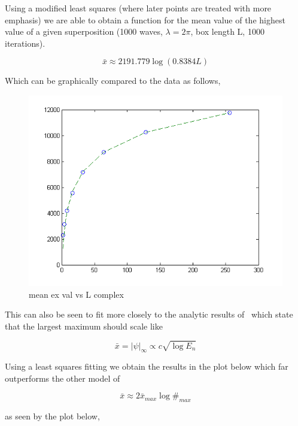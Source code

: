 \documentclass[12pt]{article}
\begin{document}
Using a modified least squares (where later points are treated with more emphasis) we are able to obtain a function for the mean value of the highest value of a given superposition (1000 waves, $\lambda = 2\pi$, box length L, 1000 iterations).

\[\bar{x} \approx 2191.779 \log(0.8384 L)\]

Which can be graphically compared to the data as follows,

\begin{figure}[hpt]
	\centering
		\includegraphics[width=1.00\textwidth]{avgExVsAcomp.png}
	\caption{mean ex val vs L complex}
	\label{fig:avgExVsAcomp}
\end{figure}

This can also be seen to fit more closely to the analytic results of~\cite{RA98} which state that the largest maximum should scale like

\[\bar{x} = |\psi|_{\infty} \propto c\sqrt{\log{E_{n}}}\]

Using a least squares fitting we obtain the results in the plot below which far outperforms the other model of

\[\bar{x} \approx 2 \bar{x}_{max} \log{\#_{max}}\]

as seen by the plot below,
\end{document}
